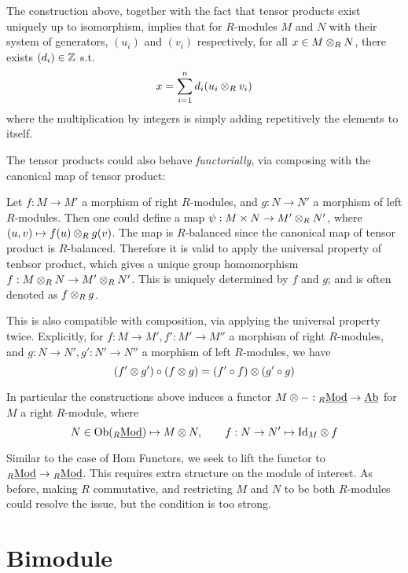 \begin{remark}\label{Rmk:decomp of tensor}
    The construction above, together with the fact that tensor products exist uniquely up to isomorphism, implies that for $R$-modules $M$ and $N$ with their system of generators, $(u_i)$ and $(v_i)$ respectively, for all $x \in M \otimes_R N$, there exists $(d_i) \in \mathbb{Z}$ s.t.
    \[
        x = \sum\limits_{i=1}^n d_i (u_i \otimes_R v_i)
    \]
    where the multiplication by integers is simply adding repetitively the elements to itself.
\end{remark}

The tensor products could also behave \emph{functorially}, via composing with the canonical map of tensor product:

Let $f: M \to M'$ a morphism of right $R$-modules, and $g: N \to N'$ a morphism of left $R$-modules. Then one could define a map $\psi: M \times N \to M' \otimes_R N'$, where $(u, v) \mapsto f(u) \otimes_R g(v)$. The map is $R$-balanced since the canonical map of tensor product is $R$-balanced. Therefore it is valid to apply the universal property of tenbsor product, which gives a unique group homomorphism $f: M \otimes_R N \to M' \otimes_R N' $. This is uniquely determined by $f$ and $g$; and is often denoted as $f \otimes_R g$. 

\begin{remark}
    This is also compatible with composition, via applying the universal property twice. Explicitly, for $f: M \to M', f': M' \to M''$ a morphism of right $R$-modules, and $g: N \to N', g': N' \to N''$ a morphism of left $R$-modules, we have
    \[
        (f' \otimes g') \circ (f \otimes g) = (f' \circ f) \otimes (g' \circ g)
    \]
\end{remark}

\begin{remark}
    In particular the constructions above induces a functor $M \otimes -: {}_{R}\underline{\textup{Mod}} \to \underline{\textup{Ab}}$ for $M$ a right $R$-module, where 
    \[
        N \in \mathrm{Ob}({}_{R}\underline{\textup{Mod}}) \mapsto M \otimes N, \qquad f: N \to N' \mapsto \mathrm{Id}_{M} \otimes f
    \]
\end{remark}

Similar to the case of Hom Functors, we seek to lift the functor to ${}_{R}\underline{\textup{Mod}} \to {}_{R}\underline{\textup{Mod}}$. This requires extra structure on the module of interest. As before, making $R$ commutative, and restricting $M$ and $N$ to be both $R$-modules could resolve the issue, but the condition is too strong.  

\section{Bimodule}

